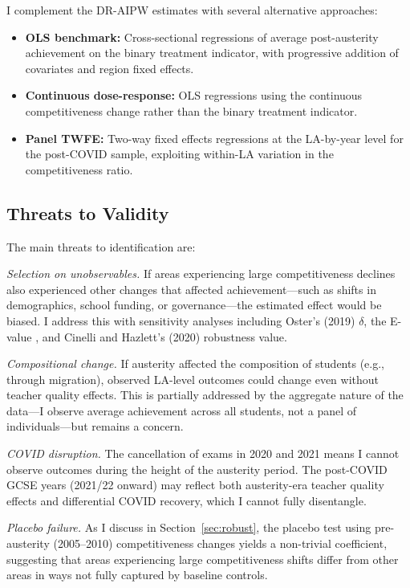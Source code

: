 \documentclass[12pt]{article}
\begin{document}
I complement the DR-AIPW estimates with several alternative approaches:
\begin{itemize}
    \item \textbf{OLS benchmark:} Cross-sectional regressions of average post-austerity achievement on the binary treatment indicator, with progressive addition of covariates and region fixed effects.
    \item \textbf{Continuous dose-response:} OLS regressions using the continuous competitiveness change rather than the binary treatment indicator.
    \item \textbf{Panel TWFE:} Two-way fixed effects regressions at the LA-by-year level for the post-COVID sample, exploiting within-LA variation in the competitiveness ratio.
\end{itemize}

\subsection{Threats to Validity}

The main threats to identification are:

\textit{Selection on unobservables.} If areas experiencing large competitiveness declines also experienced other changes that affected achievement---such as shifts in demographics, school funding, or governance---the estimated effect would be biased. I address this with sensitivity analyses including Oster's (2019) $\delta$, the E-value \citep{vanderweele2017sensitivity}, and Cinelli and Hazlett's (2020) robustness value.

\textit{Compositional change.} If austerity affected the composition of students (e.g., through migration), observed LA-level outcomes could change even without teacher quality effects. This is partially addressed by the aggregate nature of the data---I observe average achievement across all students, not a panel of individuals---but remains a concern.

\textit{COVID disruption.} The cancellation of exams in 2020 and 2021 means I cannot observe outcomes during the height of the austerity period. The post-COVID GCSE years (2021/22 onward) may reflect both austerity-era teacher quality effects and differential COVID recovery, which I cannot fully disentangle.

\textit{Placebo failure.} As I discuss in Section~\ref{sec:robust}, the placebo test using pre-austerity (2005--2010) competitiveness changes yields a non-trivial coefficient, suggesting that areas experiencing large competitiveness shifts differ from other areas in ways not fully captured by baseline controls.
\end{document}
